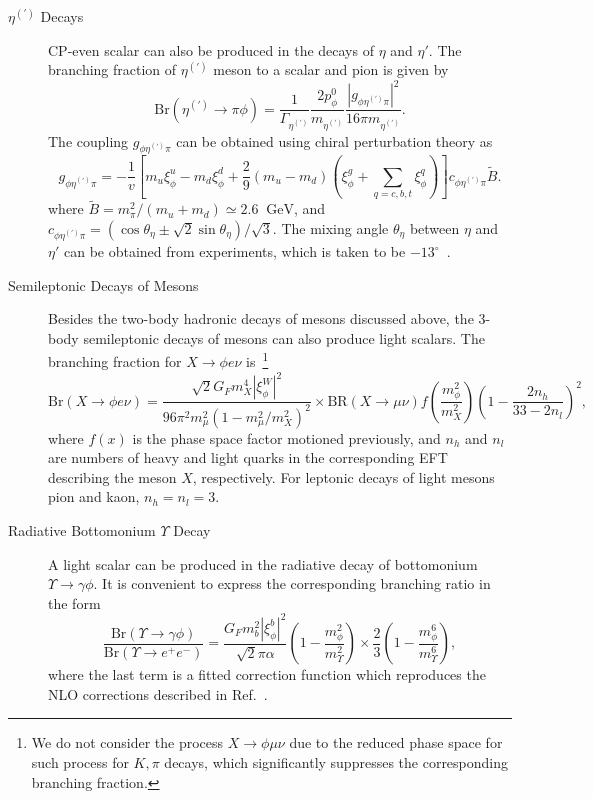 \documentclass[letterpaper,11pt]{article}
\newcommand{\gev}{\text{~GeV}}
\def\gev{\textrm{~GeV}}
\begin{document}
\begin{description}
\item[$\eta^{(\prime)}$ Decays]
CP-even scalar can also be produced in the decays of $\eta$ and $\eta'$. The branching fraction of $\eta^{(\prime)}$ meson to a scalar and pion is given by
\begin{equation}
    \text{Br}(\eta^{(\prime)}\rightarrow\pi\phi)=\frac{1}{\Gamma_{\eta^{(\prime)}}}\frac{2p_\phi^0}{m_{\eta^{(\prime)}}}\frac{|g_{\phi\eta^{(\prime)}\pi}|^2}{16\pi m_{\eta^{(\prime)}}}.
\end{equation}   
The coupling $g_{\phi\eta^{(\prime)}\pi}$ can be obtained using chiral perturbation theory as~\cite{Batell:2018fqo, Egana-Ugrinovic:2019wzj}
\begin{equation}
    g_{\phi\eta^{(\prime)}\pi}=-\frac{1}{v}\left[m_u\xi_\phi^u-m_d\xi_\phi^d+\frac{2}{9}\left(m_u-m_d\right)\left(\xi_\phi^g+\sum_{q=c, b, t}\xi_\phi^q\right)\right]c_{\phi\eta^{(\prime)}\pi}\tilde{B}.
\end{equation}
where $\tilde{B}=m_\pi^2/(m_u+m_d)\simeq 2.6~\gev$, and $c_{\phi\eta^{(\prime)}\pi}=(\cos\theta_\eta\pm\sqrt{2}\sin\theta_\eta)/\sqrt{3}$.    The mixing angle $\theta_\eta$ between $\eta$ and $\eta'$ can be obtained from experiments, which is taken to be $-13^\circ$~\cite{Domingo:2016yih}.    
 
\item[Semileptonic Decays of Mesons] 
Besides the two-body hadronic decays of mesons discussed above, the 3-body semileptonic decays of mesons can also produce light scalars. The branching fraction for $X\rightarrow\phi e\nu$ is~\footnote{We do not consider the process $X\rightarrow\phi \mu\nu$ due to the reduced phase space for such process for $K, \pi$ decays,  which significantly suppresses the corresponding branching fraction.} ~\cite{Chivukula:1988gp, Dawson:1989kr, Cheng:1989ib, Boiarska:2019jym}
 \begin{equation}
    \text{Br}(X\rightarrow\phi e\nu)=\frac{\sqrt{2}G_F m_X^4 {|{\xi_\phi^W}|^2}}{96\pi^2 m_\mu^2(1-m_\mu^2/m_X^2)^2}\times\text{BR}(X\rightarrow\mu\nu)f(\frac{m_\phi^2}{m_X^2})\left(1-\frac{2n_h}{33-2n_l}\right)^2,
\end{equation}
where $f(x)$ is the phase space factor motioned previously, and $n_h$ and $n_l$ are numbers of heavy and light quarks in the corresponding EFT describing the meson $X$, respectively.   For leptonic decays of light mesons pion and kaon,  $n_h=n_l=3$.  
 
\item[Radiative Bottomonium $\Upsilon$ Decay]
A light scalar can be produced in the radiative decay of bottomonium $\Upsilon\rightarrow\gamma\phi$. It is convenient to express the corresponding branching ratio in the form~\cite{Winkler:2018qyg}  
\begin{equation}
    \frac{\text{Br}(\Upsilon\rightarrow\gamma\phi)}{\text{Br}(\Upsilon\rightarrow e^+e^-)}=\frac{ G_F m_b^2|{\xi_\phi^b}|^2}{\sqrt{2}\pi\alpha}(1-\frac{m_\phi^2}{m_\Upsilon^2})\times \frac{2}{3}  \left(1-\frac{m_\phi^6}{m_\Upsilon^6}\right),
\end{equation}
where the last term is a fitted correction function which reproduces the NLO corrections described in  Ref.~\cite{Ellis:1985yb}. 


\end{description}
\end{document}
